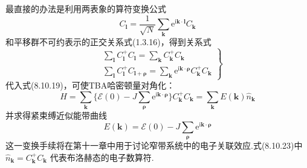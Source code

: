 最直接的办法是利用两表象的算符变换公式
\begin{equation}
  C_{\boldsymbol{l}}=\frac{1}{\sqrt{N}}\sum_{\boldsymbol{k}}\mathrm{e}^{\mathrm{i}\boldsymbol{k}\cdot\boldsymbol{l}}C_{\boldsymbol{k}}
\end{equation}
和平移群不可约表示的正交关系式(1.3.16)，得到关系式
\begin{equation}
  \left.
  \begin{aligned}
    &\sum_{\boldsymbol{l}}C_{\boldsymbol{l}}^{+}C_{\boldsymbol{l}}=\sum_{\boldsymbol{k}}C_{\boldsymbol{k}}^{+}C_{\boldsymbol{k}}\\[0.3em]
    &\sum_{\boldsymbol{l}}C_{\boldsymbol{l}}^{+}C_{\boldsymbol{l}+\boldsymbol{\rho}}=\sum_{\boldsymbol{k}}\mathrm{e}^{\mathrm{i}\boldsymbol{k}\cdot\boldsymbol{\rho}}C_{\boldsymbol{k}}^{+}C_{\boldsymbol{k}}
  \end{aligned}\right\}
\end{equation}
代入式(8.10.19)，可使TBA哈密顿量对角化：
\begin{equation}
  H=\sum_{\boldsymbol{k}}\bigl\{\mathscr{E}(0)-J\sum_{\boldsymbol{\rho}}\mathrm{e}^{\mathrm{i}\boldsymbol{k}\cdot\boldsymbol{\rho}}\bigr\}C_{\boldsymbol{k}}^{+}C_{\boldsymbol{k}}
  =\sum_{\boldsymbol{k}}E(\boldsymbol{k})\hat{n}_{\boldsymbol{k}}
\end{equation}
并求得紧束缚近似能带曲线
\begin{equation*}
  E(\boldsymbol{k})=\mathscr{E}(0)-J\sum_{\boldsymbol{\rho}}\mathrm{e}^{\mathrm{i}\boldsymbol{k}\cdot\boldsymbol{\rho}}
\end{equation*}
这一变换手续将在第十一章中用于讨论窄带系统中的电子关联效应.式(8.10.23)中 $\hat{n}_{\boldsymbol{k}}=C_{\boldsymbol{k}}^{+}C_{\boldsymbol{k}}$ 代表布洛赫态的电子数算符.

